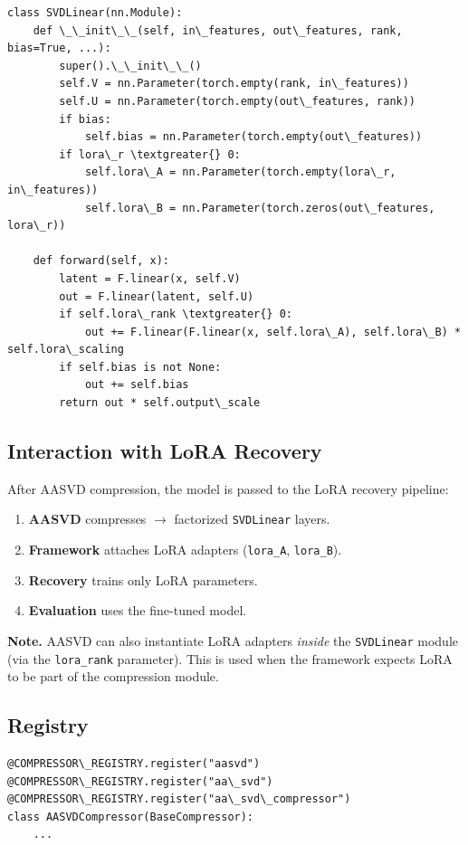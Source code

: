 \begin{lstlisting}
class SVDLinear(nn.Module):
    def \_\_init\_\_(self, in\_features, out\_features, rank, bias=True, ...):
        super().\_\_init\_\_()
        self.V = nn.Parameter(torch.empty(rank, in\_features))
        self.U = nn.Parameter(torch.empty(out\_features, rank))
        if bias:
            self.bias = nn.Parameter(torch.empty(out\_features))
        if lora\_r \textgreater{} 0:
            self.lora\_A = nn.Parameter(torch.empty(lora\_r, in\_features))
            self.lora\_B = nn.Parameter(torch.zeros(out\_features, lora\_r))
    
    def forward(self, x):
        latent = F.linear(x, self.V)
        out = F.linear(latent, self.U)
        if self.lora\_rank \textgreater{} 0:
            out += F.linear(F.linear(x, self.lora\_A), self.lora\_B) * self.lora\_scaling
        if self.bias is not None:
            out += self.bias
        return out * self.output\_scale
\end{lstlisting}

\subsection{Interaction with LoRA Recovery}

After AASVD compression, the model is passed to the LoRA recovery pipeline:

\begin{enumerate}
\item \textbf{AASVD} compresses $\to$ factorized \texttt{SVDLinear} layers.
\item \textbf{Framework} attaches LoRA adapters (\texttt{lora\_A}, \texttt{lora\_B}).
\item \textbf{Recovery} trains only LoRA parameters.
\item \textbf{Evaluation} uses the fine-tuned model.

\end{enumerate}
\textbf{Note.} AASVD can also instantiate LoRA adapters \textit{inside} the \texttt{SVDLinear} 
module (via the \texttt{lora\_rank} parameter). This is used when the framework 
expects LoRA to be part of the compression module.

\subsection{Registry}

\begin{lstlisting}
@COMPRESSOR\_REGISTRY.register("aasvd")
@COMPRESSOR\_REGISTRY.register("aa\_svd")
@COMPRESSOR\_REGISTRY.register("aa\_svd\_compressor")
class AASVDCompressor(BaseCompressor):
    ...
\end{lstlisting}

